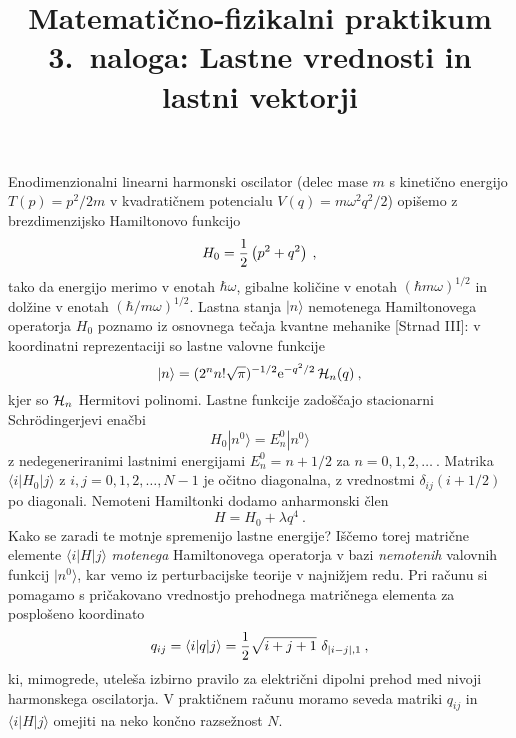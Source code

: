 \documentclass[slovene,11pt,a4paper]{article}
\title{
\sc\large Matematično-fizikalni praktikum \thisyear \\
\bigskip
\bf\Large 3.~naloga: Lastne vrednosti in lastni vektorji
}
\author{}
\date{}
\begin{document}
\maketitle
\vspace{-1cm}


Enodimenzionalni linearni harmonski oscilator (delec mase $m$
s kinetično energijo $T(p)=p^2/2m$ v kvadratičnem potencialu
$V(q)=m\omega^2 q^2/2$) opišemo z brezdimenzijsko Hamiltonovo funkcijo
\begin{equation*}
  H_0 = {1\over 2} \left( p^2 + q^2 \right) \>,
\end{equation*}
tako da energijo merimo v enotah $\hbar\omega$, gibalne količine
v enotah $(\hbar m\omega)^{1/2}$ in dolžine v enotah $(\hbar/m\omega)^{1/2}$.
Lastna stanja $|n\rangle$ nemotenega Hamiltonovega operatorja $H_0$
poznamo iz osnovnega tečaja kvantne mehanike [Strnad III]:
v koordinatni reprezentaciji so lastne valovne funkcije
\begin{equation*}
  |n\rangle = (2^n n! \sqrt{\pi})^{-1/2} \mathrm{e}^{-q^2/2}\,  {\cal H}_n (q)\>,
\end{equation*}
kjer so ${\cal H}_n$ Hermitovi polinomi.
Lastne funkcije zadoščajo stacionarni Schr\"odingerjevi enačbi
\begin{equation*}
H_0 | n^0 \rangle = E_n^0 | n^0 \rangle
\end{equation*}
z nedegeneriranimi lastnimi energijami $E_n^0 = n + 1/2$
za $n=0,1,2,\ldots~$.  Matrika $\langle i | H_0 | j\rangle$
z $i,j=0,1,2,\ldots,N-1$ je očitno diagonalna, z vrednostmi
$\delta_{ij}(i + 1/2)$ po diagonali.  Nemoteni Hamiltonki
dodamo anharmonski člen
\begin{equation*}
H = H_0 + \lambda q^4 \>.
\end{equation*}
Kako se zaradi te motnje spremenijo lastne energije?
Iščemo torej matrične elemente $\langle i | H | j\rangle$
{\sl motenega\/} Hamiltonovega operatorja v bazi {\sl nemotenih\/}
valovnih funkcij $| n^0\rangle$, kar vemo iz perturbacijske
teorije v najnižjem redu.  Pri računu si pomagamo
s pričakovano vrednostjo prehodnega matričnega
elementa za posplošeno koordinato
$$
q_{ij} = \langle i | q | j \rangle
       = {1\over 2} \sqrt{i+j+1}\,\, \delta_{|i-j|,1} \>,
$$
ki, mimogrede, uteleša izbirno pravilo za električni dipolni
prehod med nivoji harmonskega oscilatorja.  V praktičnem računu
moramo seveda matriki $q_{ij}$ in $\langle i | H | j\rangle$
omejiti na neko končno razsežnost $N$.

\bigskip
\end{document}

